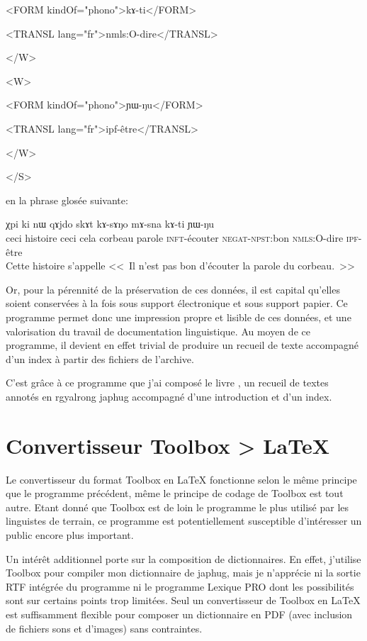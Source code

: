 \documentclass[oldfontcommands,oneside,a4paper,11pt]{memoir}
\newcommand{\ipa}[1]{{\phon #1}} %
\begin{document}
      <FORM kindOf="phono">kɤ-ti</FORM>


      <TRANSL lang="fr">nmls:O-dire</TRANSL>


    </W>


    <W>


      <FORM kindOf="phono">ɲɯ-ŋu</FORM>


      <TRANSL lang="fr">ipf-être</TRANSL>


    </W>


  </S>
 
 
 
en  la phrase glosée suivante:

\begin{exe} 
 \ex 
\gll \ipa{kɯki} \ipa{χpi} \ipa{ki} \ipa{nɯ} \ipa{qɤjdo} \ipa{skɤt} \ipa{kɤ-sɤŋo} \ipa{mɤ-sna} \ipa{kɤ-ti} \ipa{ɲɯ-ŋu}\\ 
ceci histoire ceci cela corbeau parole \textsc{inft}-écouter \textsc{negat}-\textsc{npst}:bon \textsc{nmls}:O-dire \textsc{ipf}-être\\ 
 \glt Cette histoire s'appelle <<~Il n'est pas bon d'écouter la parole du corbeau.~>>
\end{exe} 
 
 
Or, pour la pérennité de la préservation de ces données, il est capital qu'elles soient conservées à la fois sous support électronique et sous support papier. Ce programme permet donc une impression propre et lisible de ces données, et une valorisation du travail de documentation linguistique. Au moyen de ce programme, il devient en effet trivial de produire un recueil de texte accompagné d'un index à partir des fichiers de l'archive.

C'est grâce à ce programme que j'ai composé le livre \citet{jacques10gesar}, un recueil de textes annotés en rgyalrong japhug accompagné d'une introduction et d'un index.





\section{Convertisseur Toolbox > \LaTeX}
Le convertisseur du format Toolbox en \LaTeX{} fonctionne selon le même principe que le programme précédent, même le principe de codage de Toolbox est tout autre. Etant donné que Toolbox est de loin le programme le plus utilisé par les linguistes de terrain, ce programme est potentiellement susceptible d'intéresser un public encore plus important.

Un intérêt additionnel porte sur la composition de dictionnaires. En effet, j'utilise Toolbox pour compiler mon dictionnaire de japhug, mais je n'apprécie ni la sortie RTF intégrée du programme ni le programme Lexique PRO dont les possibilités sont sur certains points trop limitées. Seul un convertisseur de Toolbox en \LaTeX{} est suffisamment flexible pour composer un dictionnaire en PDF (avec inclusion de fichiers sons et d'images) sans contraintes.
\end{document}
